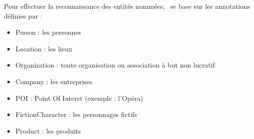 \documentclass[manual-fr.tex]{subfiles}
\begin{document}
Pour effectuer la reconnaissance des entités nommées, \SEM\ se base sur les annotations définies par \cite{sagot-richard-stern:2012:TALN} :\\

\begin{itemize}
	\item[] Person : les personnes
	\item[] Location : les lieux
	\item[] Organization : toute organisation ou association à but non lucratif
	\item[] Company : les entreprises
	\item[] POI : Point Of Interet (exemple : l'Opéra)
	\item[] FictionCharacter : les personnages fictifs
	\item[] Product : les produits
\end{itemize}
\end{document}
